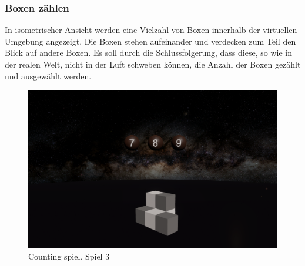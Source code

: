 \subsubsection{Boxen zählen} 
In isometrischer Ansicht werden eine Vielzahl von Boxen innerhalb der virtuellen Umgebung angezeigt. Die Boxen stehen aufeinander und verdecken zum Teil den Blick auf andere Boxen. Es soll durch die Schlussfolgerung, dass diese, so wie in der realen Welt, nicht in der Luft schweben können, die Anzahl der Boxen gezählt und ausgewählt werden.

\begin{figure}
	\includegraphics[width=\textwidth]{./images/counting.png}
	\caption{Counting spiel. Spiel 3}
	\label{fig:counting}
\end{figure}

